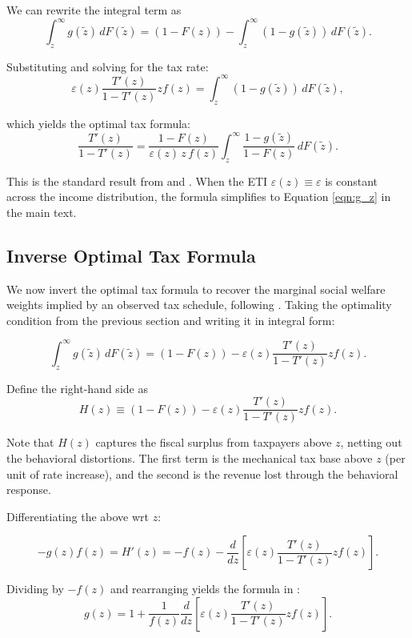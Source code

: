 \documentclass[12pt]{article}
\begin{document}
We can rewrite the integral term as
$$\int_{z}^{\infty} g(\tilde{z}) \, dF(\tilde{z}) = (1-F(z)) - \int_{z}^{\infty} (1-g(\tilde{z})) \, dF(\tilde{z}).$$

Substituting and solving for the tax rate:
$$\varepsilon(z) \frac{T'(z)}{1-T'(z)} z f(z) = \int_{z}^{\infty} (1-g(\tilde{z})) \, dF(\tilde{z}),$$

which yields the optimal tax formula:
\begin{equation}
\label{eqn:optimal_tax}
\frac{T'(z)}{1-T'(z)} = \frac{1-F(z)}{\varepsilon(z) \, z \, f(z)} \int_{z}^{\infty} \frac{1-g(\tilde{z})}{1-F(z)} \, dF(\tilde{z}).
\end{equation}

This is the standard result from \citet{Saez2001} and \citet{Diamond1998}. When the ETI $\varepsilon(z) \equiv \varepsilon$ is constant across the income distribution, the formula simplifies to Equation \ref{eqn:g_z} in the main text.

\subsection{Inverse Optimal Tax Formula}

We now invert the optimal tax formula to recover the marginal social welfare weights implied by an observed tax schedule, following \citet{JJZ2017}. Taking the optimality condition from the previous section and writing it in integral form:

\begin{equation}
\int_{z}^{\infty} g(\tilde{z}) \, dF(\tilde{z}) = (1-F(z)) - \varepsilon(z) \frac{T'(z)}{1-T'(z)} z f(z).
\end{equation}

Define the right-hand side as
$$H(z) \equiv (1-F(z)) - \varepsilon(z) \frac{T'(z)}{1-T'(z)} z f(z).$$

Note that $H(z)$ captures the fiscal surplus from taxpayers above $z$, netting out the behavioral distortions. The first term is the mechanical tax base above $z$ (per unit of rate increase), and the second is the revenue lost through the behavioral response.

Differentiating the above wrt $z$:

$$-g(z) f(z) = H'(z) = -f(z) - \frac{d}{dz}\left[\varepsilon(z) \frac{T'(z)}{1-T'(z)} z f(z)\right].$$

Dividing by $-f(z)$ and rearranging yields the formula in \citet{LW2016}:
\begin{equation}
\label{eqn:gz_general}
g(z) = 1 + \frac{1}{f(z)}\frac{d}{dz}\left[\varepsilon(z) \frac{T'(z)}{1-T'(z)} z f(z)\right].
\end{equation}
\end{document}
